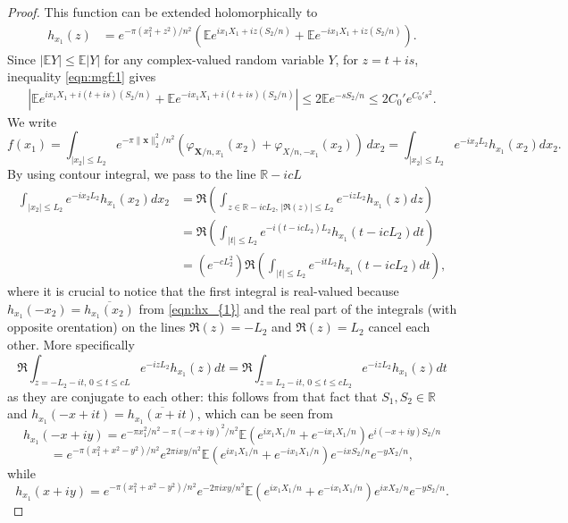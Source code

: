 \documentclass[reqno]{amsart}
\newcommand\R{{\mathbb{R}}}
\newcommand\E{{\mathbb{E}}}
\newcommand\BMx{{\bm x}}
\newcommand\BMX{{\bm X}}
\theoremstyle{plain}
\theoremstyle{definition}
\begin{document}
\begin{proof}
This function can be extended holomorphically to 
\begin{align*}
h_{x_{1}}(z)&=e^{-\pi  (x_{1}^{2}+ z^{2})/n^{2}}  (\mathbb{E} e^{i x_{1} X_{1} + i z (S_{2}/n)} +  \mathbb{E} e^{-i x_{1} X_{1} +i z (S_{2}/n)}).
\end{align*}
Since $|\mathbb{E} Y| \le \mathbb{E} |Y|$ for any complex-valued random variable $Y$, for $z=t+is$, inequality \eqref{eqn:mgf:1} gives 
\begin{align}\label{eqn:CS:2} 
|\mathbb{E} e^{i x_{1} X_{1} + i (t+is) (S_{2}/n)} +  \mathbb{E} e^{-i x_{1} X_{1} +i (t+is) (S_{2}/n)} | \le 2 \E  e^{{-sS_{2}/n}}  \le 2C_{0}'e^{C_{0}'s^{2}}.
\end{align}
We write
$$f(x_{1})=\int_{|x_{2}| \le L_{2}} e^{-\pi  \|\BMx\|_{2}^{2}/n^{2}} (\varphi_{\BMX/n,x_{1}}(x_{2})+\varphi_{X/n,-x_{1}}(x_{2})) \, dx_{2} =\int_{|x_{2}| \le L_{2}} e^{-i x_{2}L_{2}} h_{x_{1}}(x_{2}) dx_{2}.$$
By using contour integral, we pass to the line $\R-icL$
\begin{align}\label{eqn:contour:joint}
\int_{|x_{2}| \le L_{2}} e^{-i x_{2}L_{2}}h_{x_{1}}(x_{2})dx_{2} &=\Re (\int_{z\in \R-icL_{2}, \, |\Re(z)| \le L_{2}} e^{-i zL_{2}} h_{x_{1}}(z)dz) \nonumber  \\
&= \Re (\int_{|t| \le L_{2}} e^{-i(t-icL_{2})L_{2}} h_{x_{1}}(t-icL_{2})dt) \nonumber \\
&=(e^{-cL_{2}^{2}}) \Re (\int_{|t| \le L_{2}} e^{-itL_{2}} h_{x_{1}}(t-icL_{2})dt),
\end{align}
where it is crucial to notice that the first integral is real-valued because $h_{x_{1}}(-x_{2}) = \overline{{h}_{x_{1}}(x_{2})}$ from \eqref{eqn:hx_{1}} and the real part of the integrals (with opposite orentation) on the lines $\Re(z) = -L_{2}$ and $\Re(z) = L_{2}$ cancel each other. More specifically
$$\Re \int_{z=-L_{2} - it, \, 0\le t\le cL} e^{-i zL_{2}}h_{x_{1}}(z)dt = \Re \int_{z=L_{2} - it, \, 0\le t\le cL_{2}} e^{-i zL_{2}}h_{x_{1}}(z)dt$$
as they are conjugate to each other: this follows from that fact that  $S_{1},S_{2} \in \R$ and $h_{x_{1}}(-x+it) = \overline{{h}_{x_{1}}(x+it)}$, which can be  seen from 
$$h_{x_{1}}(-x+iy) =e^{-\pi  x_{1}^{2}/n^{2}-\pi  (-x+iy)^{2}/n^{2}} \E (e^{i x_{1} X_{1}/n}+ e^{-i x_{1} X_{1}/n} ) e^{i(-x+iy)S_{2}/n}$$
$$ =e^{-\pi (x_{1}^{2}+x^{2}-y^{2})/n^{2}} e^{2\pi i xy/n^{2}} \E (e^{i x_{1} X_{1}/n}+ e^{-i x_{1} X_{1}/n} ) e^{-i x S_{2}/n} e^{-yX_{2}/n},$$ 
while 
$$h_{x_{1}}(x+iy) =e^{-\pi (x_{1}^{2}+x^{2}-y^{2})/n^{2}} e^{-2\pi i xy/n^{2}} \E (e^{i x_{1} X_{1}/n}+ e^{-i x_{1} X_{1}/n} ) e^{i x X_{2}/n} e^{-yS_{2}/n}.$$

\end{proof}
\end{document}

